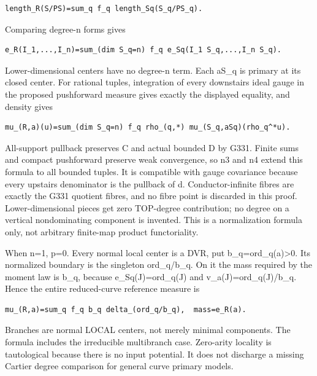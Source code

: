 \documentclass[11pt]{article}
\begin{document}
\begin{Verbatim}[fontsize=\small,breaklines=true,breakanywhere=true]
length_R(S/PS)=sum_q f_q length_Sq(S_q/PS_q).
\end{Verbatim}

Comparing degree-n forms gives

\begin{Verbatim}[fontsize=\small,breaklines=true,breakanywhere=true]
e_R(I_1,...,I_n)=sum_(dim S_q=n) f_q e_Sq(I_1 S_q,...,I_n S_q).
\end{Verbatim}

Lower-dimensional centers have no degree-n term. Each aS\_q is primary at its closed center. For rational tuples, integration of every downstairs ideal gauge in the proposed pushforward measure gives exactly the displayed equality, and density gives

\begin{Verbatim}[fontsize=\small,breaklines=true,breakanywhere=true]
mu_(R,a)(u)=sum_(dim S_q=n) f_q rho_(q,*) mu_(S_q,aSq)(rho_q^*u).
\end{Verbatim}

All-support pullback preserves C and actual bounded D by G331. Finite sums and compact pushforward preserve weak convergence, so n3 and n4 extend this formula to all bounded tuples. It is compatible with gauge covariance because every upstairs denominator is the pullback of d. Conductor-infinite fibres are exactly the G331 quotient fibres, and no fibre point is discarded in this proof. Lower-dimensional pieces get zero TOP-degree contribution; no degree on a vertical nondominating component is invented. This is a normalization formula only, not arbitrary finite-map product functoriality.

When n=1, p=0. Every normal local center is a DVR, put b\_q=ord\_q(a)>0. Its normalized boundary is the singleton ord\_q/b\_q. On it the mass required by the moment law is b\_q, because e\_Sq(J)=ord\_q(J) and v\_a(J)=ord\_q(J)/b\_q. Hence the entire reduced-curve reference measure is

\begin{Verbatim}[fontsize=\small,breaklines=true,breakanywhere=true]
mu_(R,a)=sum_q f_q b_q delta_(ord_q/b_q),  mass=e_R(a).
\end{Verbatim}

Branches are normal LOCAL centers, not merely minimal components. The formula includes the irreducible multibranch case. Zero-arity locality is tautological because there is no input potential. It does not discharge a missing Cartier degree comparison for general curve primary models.
\end{document}
